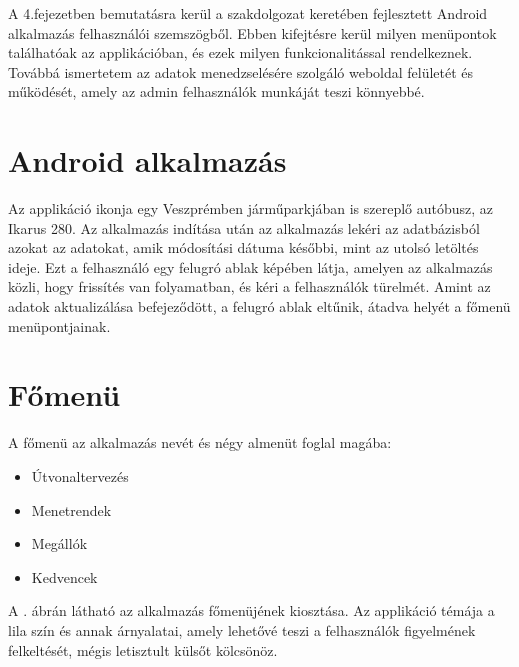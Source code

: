 
A 4.fejezetben bemutatásra kerül a szakdolgozat keretében fejlesztett Android alkalmazás felhasználói szemszögből.
Ebben kifejtésre kerül milyen menüpontok találhatóak az applikációban, és ezek milyen funkcionalitással rendelkeznek.
Továbbá ismertetem az adatok menedzselésére szolgáló weboldal felületét és működését, amely az admin felhasználók munkáját teszi könnyebbé.

\section{Android alkalmazás}
\label{androidapp}
Az applikáció ikonja egy Veszprémben járműparkjában is szereplő autóbusz, az Ikarus 280.
Az alkalmazás indítása után az alkalmazás lekéri az adatbázisból azokat az adatokat, amik módosítási dátuma későbbi, mint az utolsó letöltés ideje.
Ezt a felhasználó egy felugró ablak képében látja, amelyen az alkalmazás közli, hogy frissítés van folyamatban, és kéri a felhasználók türelmét.
Amint az adatok aktualizálása befejeződött, a felugró ablak eltűnik, átadva helyét a főmenü menüpontjainak.

\section {Főmenü}
\label {fomenu}
A főmenü az alkalmazás nevét és négy almenüt foglal magába:
\begin{itemize}
	\item Útvonaltervezés
	\item Menetrendek
	\item Megállók
	\item Kedvencek
\end{itemize}

A . ábrán látható az alkalmazás főmenüjének kiosztása. 
Az applikáció témája a lila szín és annak árnyalatai, amely lehetővé teszi a felhasználók figyelmének felkeltését, mégis letisztult külsőt kölcsönöz.

